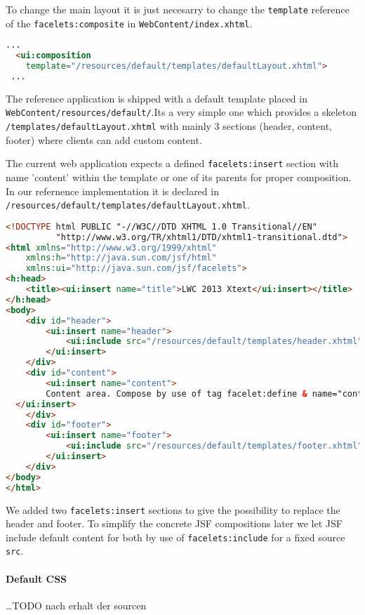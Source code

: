 To change the main layout it is just necesarry to change the \texttt{template}
reference of the \newline\texttt{facelets:composite} in
\texttt{WebContent/index.xhtml}.\newline

\begin{lstlisting}[language=HTML]
 ...
  <ui:composition
    template="/resources/default/templates/defaultLayout.xhtml">
 ...
\end{lstlisting}

The reference application is shipped with a default template placed in \newline
\texttt{WebContent/resources/default/}.\newline Its a very simple one which
provides a skeleton \newline \texttt{/templates/defaultLayout.xhtml} \newline
with mainly 3 sections (header, content, footer) where clients can add custom content.

The current web application expects a defined \texttt{facelets:insert}
section with name 'content' within the template or one of its parents for proper
composition. In our refernence implementation it is declared in \newline
\texttt{/resources/default/templates/defaultLayout.xhtml}.

\begin{lstlisting}[language=HTML]
<!DOCTYPE html PUBLIC "-//W3C//DTD XHTML 1.0 Transitional//EN" 
          "http://www.w3.org/TR/xhtml1/DTD/xhtml1-transitional.dtd">
<html xmlns="http://www.w3.org/1999/xhtml"
	xmlns:h="http://java.sun.com/jsf/html"
	xmlns:ui="http://java.sun.com/jsf/facelets">
<h:head>
	<title><ui:insert name="title">LWC 2013 Xtext</ui:insert></title>
</h:head>
<body>
	<div id="header">
		<ui:insert name="header">
			<ui:include src="/resources/default/templates/header.xhtml" />
		</ui:insert>
	</div>
	<div id="content">
		<ui:insert name="content">
    	Content area. Compose by use of tag facelet:define & name="content".
  </ui:insert>
	</div>
	<div id="footer">
		<ui:insert name="footer">
			<ui:include src="/resources/default/templates/footer.xhtml" />
		</ui:insert>
	</div>
</body>
</html>
\end{lstlisting}

We added two \texttt{facelets:insert} sections to give the possibility to
replace the header and footer. To simplify the concrete JSF compositions later we let JSF include
default content for both by use of \texttt{facelets:include} for a fixed source
\texttt{src}.

\paragraph{Default CSS}
$\;$ \\
\ldots TODO nach erhalt der sourcen
